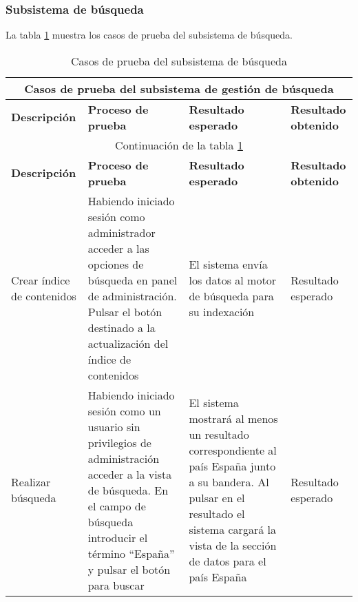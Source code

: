 \begin{landscape}
	 \subsubsection{Subsistema de búsqueda}
	 	La tabla \ref{table:casos_prueba_busqueda} muestra los casos de prueba del subsistema de búsqueda.
	 	
	 	\begin{longtable}[c]{|p{50mm}|p{50mm}|p{50mm}|p{50mm}|}
	 	 \caption{Casos de prueba del subsistema de búsqueda\label{table:casos_prueba_busqueda}}\\
	 	
	 	 \hline
	 	 \multicolumn{4}{|c|}{\textbf{Casos de prueba del subsistema de gestión de búsqueda}}\\
	 	 \hline
	 	 \textbf{Descripción} & \textbf{Proceso de prueba} & \textbf{Resultado esperado} & \textbf{Resultado obtenido}\\
	 	 \hline
	 	 \hline
	 	 \endfirsthead
	 	 
	 	 \hline
	 	 \multicolumn{4}{|c|}{Continuación de la tabla \ref{table:casos_prueba_busqueda}}\\
	 	 \hline
	 	 \textbf{Descripción} & \textbf{Proceso de prueba} & \textbf{Resultado esperado} & \textbf{Resultado obtenido}\\
	 	 \hline
	 	 \hline
	 	 \endhead
	 	 
	 	 \hline
	 	 \endfoot
	 	 
	 	Crear índice de contenidos & Habiendo iniciado sesión como administrador acceder a las opciones de búsqueda en panel de administración.  Pulsar el botón destinado a la actualización del índice de contenidos & El sistema envía los datos al motor de búsqueda para su indexación & Resultado esperado\\
	 	\hline
	 	Realizar búsqueda & Habiendo iniciado sesión como un usuario sin privilegios de administración acceder a la vista de búsqueda.  En el campo de búsqueda introducir el término ``España'' y pulsar el botón para buscar & El sistema mostrará al menos un resultado correspondiente al país España junto a su bandera. Al pulsar en el resultado el sistema cargará la vista de la sección de datos para el país España & Resultado esperado\\
	 	\hline
	 	\hline
	 	
	 	 \end{longtable}
\end{landscape}